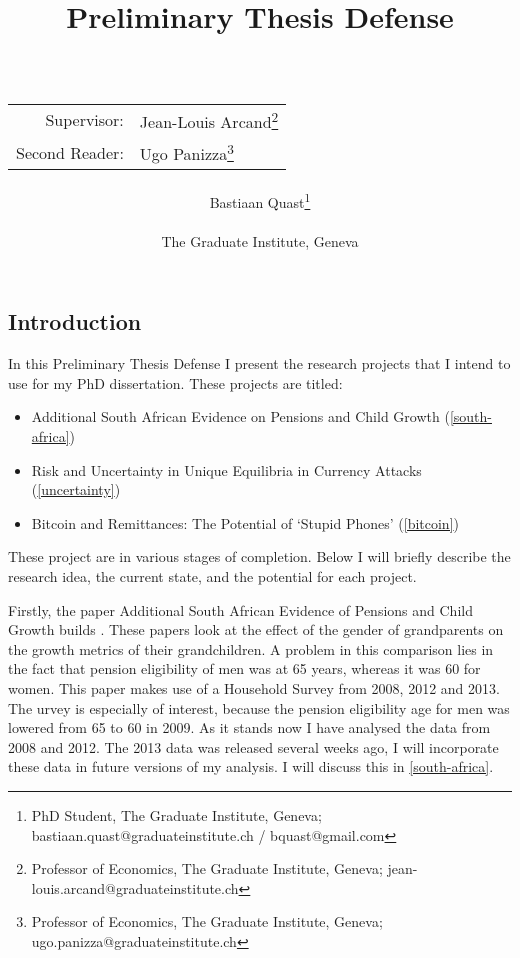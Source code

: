 \documentclass[a4paper]{report}
\title{Preliminary Thesis Defense\\~\\
\begin{tabular}{rl}
Supervisor:&Jean-Louis Arcand\footnote{Professor of Economics, The Graduate Institute, Geneva; jean-louis.arcand@graduateinstitute.ch}\\
Second Reader:&Ugo Panizza\footnote{Professor of Economics, The Graduate Institute, Geneva; ugo.panizza@graduateinstitute.ch}
\end{tabular}
}
\author{Bastiaan Quast\thanks{PhD Student, The Graduate Institute, Geneva; bastiaan.quast@graduateinstitute.ch / bquast@gmail.com}\\~\\
The Graduate Institute, Geneva}
\begin{document}
\maketitle
\tableofcontents
\listoftables
\listoffigures

\begin{refsection}
\chapter{Introduction}
In this Preliminary Thesis Defense I present the research projects that I intend to use for my PhD dissertation. These projects are titled:

\begin{itemize}
\item Additional South African Evidence on Pensions and Child Growth (\autoref{south-africa})
\item Risk and Uncertainty in Unique Equilibria in Currency Attacks (\autoref{uncertainty})
\item Bitcoin and Remittances: The Potential of `Stupid Phones' (\autoref{bitcoin})
\end{itemize}

These project are in various stages of completion.
Below I will briefly describe the research idea, the current state, and the potential for each project.

Firstly, the paper Additional South African Evidence of Pensions and Child Growth builds \textcite{duflo2000child, duflo2003grandmothers}.
These papers look at the effect of the gender of grandparents on the growth metrics of their grandchildren.
A problem in this comparison lies in the fact that pension eligibility of men was at 65 years, whereas it was 60 for women.
This paper makes use of a Household Survey from 2008, 2012 and 2013. The 
urvey is especially of interest, because the pension eligibility age for men was lowered from 65 to 60 in 2009.
As it stands now I have analysed the data from 2008 and 2012.
The 2013 data was released several weeks ago, I will incorporate these data in future versions of my analysis.
I will discuss this in \autoref{south-africa}.



\end{refsection}
\end{document}
